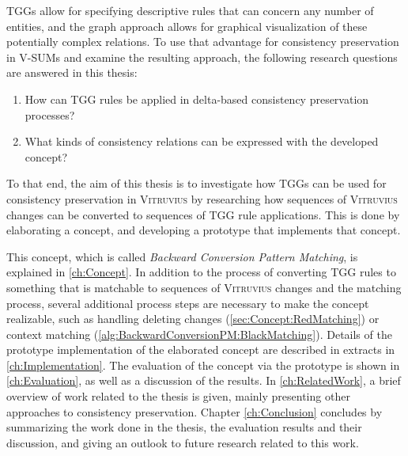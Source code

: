 TGGs allow for specifying descriptive rules that can concern any number of entities, and the graph approach allows for graphical visualization of these potentially complex relations. To use that advantage for consistency preservation in V-SUMs and examine the resulting approach, the following research questions are answered in this thesis:
\begin{enumerate}
    \item How can TGG rules be applied in delta-based consistency preservation processes?
    \item What kinds of consistency relations can be expressed with the developed concept?
\end{enumerate}

To that end, the aim of this thesis is to investigate how TGGs can be used for consistency preservation in \textsc{Vitruvius} by researching how sequences of \textsc{Vitruvius} changes can be converted to sequences of TGG rule applications. This is done by elaborating a concept, and developing a prototype that implements that concept.

This concept, which is called \emph{Backward Conversion Pattern Matching}, is explained in \autoref{ch:Concept}. In addition to the process of converting TGG rules to something that is matchable to sequences of \textsc{Vitruvius} changes and the matching process, several additional process steps are necessary to make the concept realizable, such as handling deleting changes (\autoref{sec:Concept:RedMatching}) or context matching (\autoref{alg:BackwardConversionPM:BlackMatching}).
Details of the prototype implementation of the elaborated concept are described in extracts in \autoref{ch:Implementation}.
The evaluation of the concept via the prototype is shown in \autoref{ch:Evaluation}, as well as a discussion of the results.
In \autoref{ch:RelatedWork}, a brief overview of work related to the thesis is given, mainly presenting other approaches to consistency preservation.
Chapter \ref{ch:Conclusion} concludes by summarizing the work done in the thesis, the evaluation results and their discussion, and giving an outlook to future research related to this work.